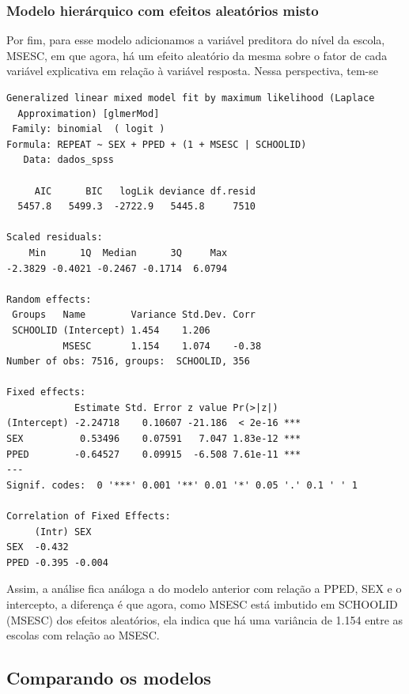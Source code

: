\documentclass[
  letterpaper,
  DIV=11,
  numbers=noendperiod]{scrartcl}
\begin{document}
\hypertarget{modelo-hieruxe1rquico-com-efeitos-aleatuxf3rios-misto}{%
\subsubsection{Modelo hierárquico com efeitos aleatórios
misto}\label{modelo-hieruxe1rquico-com-efeitos-aleatuxf3rios-misto}}

Por fim, para esse modelo adicionamos a variável preditora do nível da
escola, MSESC, em que agora, há um efeito aleatório da mesma sobre o
fator de cada variável explicativa em relação à variável resposta. Nessa
perspectiva, tem-se

\begin{verbatim}
Generalized linear mixed model fit by maximum likelihood (Laplace
  Approximation) [glmerMod]
 Family: binomial  ( logit )
Formula: REPEAT ~ SEX + PPED + (1 + MSESC | SCHOOLID)
   Data: dados_spss

     AIC      BIC   logLik deviance df.resid 
  5457.8   5499.3  -2722.9   5445.8     7510 

Scaled residuals: 
    Min      1Q  Median      3Q     Max 
-2.3829 -0.4021 -0.2467 -0.1714  6.0794 

Random effects:
 Groups   Name        Variance Std.Dev. Corr 
 SCHOOLID (Intercept) 1.454    1.206         
          MSESC       1.154    1.074    -0.38
Number of obs: 7516, groups:  SCHOOLID, 356

Fixed effects:
            Estimate Std. Error z value Pr(>|z|)    
(Intercept) -2.24718    0.10607 -21.186  < 2e-16 ***
SEX          0.53496    0.07591   7.047 1.83e-12 ***
PPED        -0.64527    0.09915  -6.508 7.61e-11 ***
---
Signif. codes:  0 '***' 0.001 '**' 0.01 '*' 0.05 '.' 0.1 ' ' 1

Correlation of Fixed Effects:
     (Intr) SEX   
SEX  -0.432       
PPED -0.395 -0.004
\end{verbatim}

Assim, a análise fica análoga a do modelo anterior com relação a PPED,
SEX e o intercepto, a diferença é que agora, como MSESC está imbutido em
SCHOOLID (MSESC) dos efeitos aleatórios, ela indica que há uma variância
de 1.154 entre as escolas com relação ao MSESC.

\hypertarget{comparando-os-modelos}{%
\subsection{Comparando os modelos}\label{comparando-os-modelos}}
\end{document}
